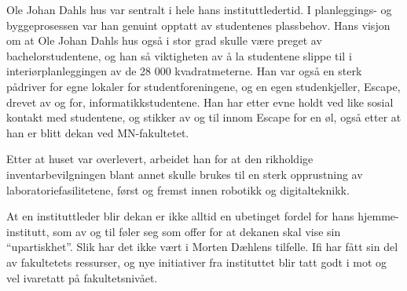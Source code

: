 Ole Johan Dahls hus var sentralt i hele hans instituttledertid. I planleggings- og byggeprosessen var han genuint opptatt av studentenes plassbehov. Hans visjon om at Ole Johan Dahls hus også i stor grad skulle være preget av bachelorstudentene, og han så viktigheten av å la studentene slippe til i interiørplanleggingen av de 28 000 kvadratmeterne. Han var også en sterk pådriver for egne lokaler for studentforeningene, og en egen studenkjeller, Escape, drevet av og for, informatikkstudentene. Han har etter evne holdt ved like sosial kontakt med studentene, og stikker av og til innom Escape for en øl, også etter at han er blitt dekan ved MN-fakultetet.

Etter at huset var overlevert, arbeidet han for at den rikholdige inventarbevilgningen blant annet skulle brukes til en sterk opprustning av laboratoriefasilitetene, først og fremst innen robotikk og digitalteknikk.

At en instituttleder blir dekan er ikke alltid en ubetinget fordel for hans hjemme-institutt, som av og til føler seg som offer for at dekanen skal vise sin ``upartiskhet''. Slik har det ikke vært i Morten Dæhlens tilfelle. Ifi har fått sin del av fakultetets ressurser, og nye initiativer fra instituttet blir tatt
godt i mot og vel ivaretatt på fakultetsnivået.

